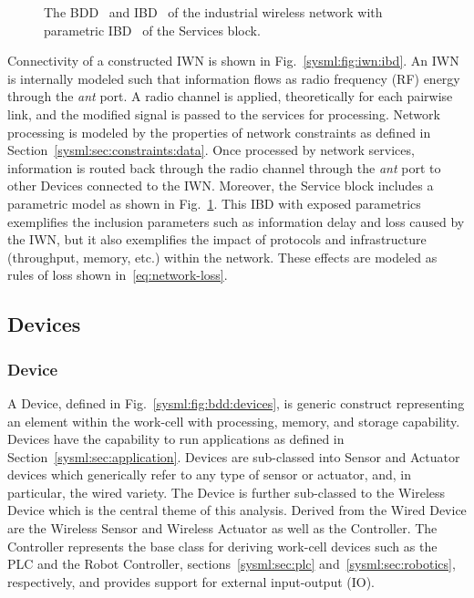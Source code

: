 \begin{figure}[ht]
	\caption{The BDD~\protect{} and IBD~\protect{} of the industrial wireless network with parametric IBD~\protect{} of the Services block.}
	\label{sysml:fig:iwn:ibd:full}
\end{figure}

Connectivity of a constructed IWN is shown in Fig.~\ref{sysml:fig:iwn:ibd}.  An IWN is internally modeled such that information flows as radio frequency (RF) energy through the \textit{ant} port.  A radio channel is applied, theoretically for each pairwise link, and the modified signal is passed to the services for processing.  Network processing is modeled by the properties of network constraints as defined in Section~\ref{sysml:sec:constraints:data}.  Once processed by network services, information is routed back through the radio channel through the \textit{ant} port to other Devices connected to the IWN.  Moreover, the Service block includes a parametric model as shown in Fig.~\ref{sysml:fig:iwn:ibd:full}. This IBD with exposed parametrics exemplifies the inclusion parameters such as information delay and loss caused by the IWN, but it also exemplifies the impact of protocols and infrastructure (throughput, memory, etc.) within the network.  These effects are modeled as rules of loss shown in~\eqref{eq:network-loss}.

\subsection{Devices}\label{sysml:sec:devices}

\subsubsection{Device}\label{sysml:sec:devices:device}

A Device, defined in Fig.~\ref{sysml:fig:bdd:devices}, is generic construct representing an element within the work-cell with processing, memory, and storage capability. Devices have the capability to run applications as defined in Section~\ref{sysml:sec:application}.  Devices are sub-classed into Sensor and Actuator devices which generically refer to any type of sensor or actuator, and, in particular, the wired variety.  The Device is further sub-classed to the Wireless Device which is the central theme of this analysis.  Derived from the Wired Device are the Wireless Sensor and Wireless Actuator as well as the Controller.  The Controller represents the base class for deriving work-cell devices such as the PLC and the Robot Controller, sections~\ref{sysml:sec:plc} and~\ref{sysml:sec:robotics}, respectively, and provides support for external input-output (IO).

